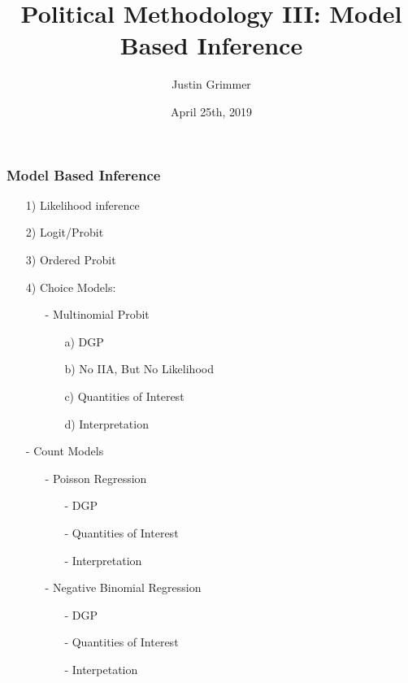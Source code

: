 \documentclass{beamer}
\title[Methodology III] %
{Political Methodology III: Model Based Inference}
\author{Justin Grimmer}
\institute[Stanford University]{Professor\\Department of Political Science \\  Stanford University}
\date{April 25th, 2019}
\begin{document}
\begin{frame}
\titlepage
\end{frame}


\begin{frame}
\frametitle{Model Based Inference}

\begin{itemize}
\item[1)] Likelihood inference
\item[2)] Logit/Probit
\item[3)] Ordered Probit
\item[4)] Choice Models:
\begin{itemize}
\item[-] Multinomial Probit
\begin{itemize}
\item[a)] DGP
\item[b)] No IIA, But No Likelihood
\item[c)] Quantities of Interest
\item[d)] Interpretation
\end{itemize}
\end{itemize}
\item[-] Count Models
\begin{itemize}
\item[-] Poisson Regression
\begin{itemize}
\item[-] DGP
\item[-] Quantities of Interest
\item[-] Interpretation
\end{itemize}
\item[-] Negative Binomial Regression
\begin{itemize}
\item[-] DGP
\item[-] Quantities of Interest
\item[-] Interpetation
\end{itemize}
\end{itemize}
\end{itemize}

\end{frame}



\end{document}
